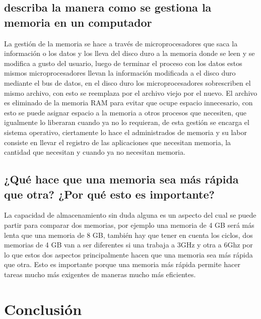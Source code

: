 \documentclass{article}
\begin{document}
    \subsection{describa la manera como se gestiona la memoria en un computador}
    La gestión de la memoria se hace a través de microprocesadores que saca la información o los datos y los lleva del disco duro a la memoria donde se  leen y se modifica a gusto del usuario, luego de terminar el proceso con los datos estos mismos microprocesadores llevan la información modificada a el disco duro mediante el bus de datos, en el disco duro los microprocesadores sobrescriben el mismo archivo, con esto se reemplaza por el archivo viejo por el nuevo. 
    El archivo es eliminado de la memoria RAM para evitar que ocupe espacio innecesario, con esto se puede asignar espacio a la memoria a otros procesos que necesiten, que igualmente lo liberaran cuando ya no lo requieran, de esta gestión se encarga el sistema operativo, ciertamente lo hace el administrados de memoria y su labor consiste en llevar el registro de las aplicaciones que necesitan memoria, la cantidad que necesitan y cuando ya no necesitan memoria.
 
    
    
    \subsection{¿Qué hace que una memoria sea más rápida que otra? ¿Por qué esto es importante?}
    La capacidad de almacenamiento sin duda alguna es un aspecto del cual se puede partir para comparar dos memorias, por ejemplo una memoria de 4 GB será más lenta que una memoria de 8 GB, también hay que tener en cuenta los ciclos, dos memorias de 4 GB van a ser diferentes si una trabaja a 3GHz y otra a 6Ghz por lo que estos dos aspectos principalmente hacen que una memoria sea más rápida que otra. Esto es importante porque una memoria más rápida permite hacer tareas mucho más exigentes de maneras mucho más eficientes. 


\section{Conclusión} \label{conclulsion}





\end{document}
